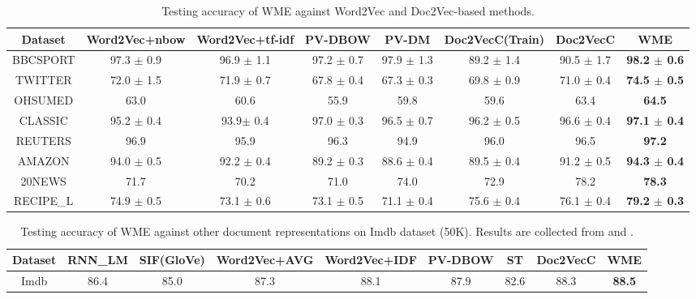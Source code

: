 \documentclass[11pt,a4paper]{article}
\newcommand{\1}{\boldsymbol{1}}
\begin{document}
\begin{table}[h]
\centering
\scriptsize
\caption{Testing accuracy of WME against Word2Vec and Doc2Vec-based methods.}
\label{App:tb:comp_word2vec}
\newcommand{\Bd}[1]{\textbf{#1}}
\begin{center}
    \begin{tabular}{ c c c c c c c c}
    \hline
    Dataset & Word2Vec+nbow & Word2Vec+tf-idf & PV-DBOW & PV-DM & Doc2VecC(Train) & Doc2VecC & WME \\ \hline 
    BBCSPORT  & 97.3 $\pm$ 0.9 & 96.9 $\pm$ 1.1 & 97.2 $\pm$ 0.7 & 97.9 $\pm$ 1.3 & 89.2 $\pm$ 1.4 & 90.5 $\pm$ 1.7 & \Bd{98.2 $\pm$ 0.6} \\ %
    TWITTER  & 72.0 $\pm$ 1.5 & 71.9 $\pm$ 0.7 & 67.8 $\pm$ 0.4 & 67.3 $\pm$ 0.3 & 69.8 $\pm$ 0.9 & 71.0 $\pm$ 0.4 & \Bd{74.5 $\pm$ 0.5} \\ %
    OHSUMED & 63.0 & 60.6 & 55.9 & 59.8 & 59.6 & 63.4 & \Bd{64.5} \\ %
    CLASSIC & 95.2 $\pm$ 0.4 & 93.9$\pm$ 0.4 & 97.0 $\pm$ 0.3 & 96.5 $\pm$ 0.7 & 96.2 $\pm$ 0.5 & 96.6 $\pm$ 0.4  & \Bd{97.1 $\pm$ 0.4} \\ %
    REUTERS & 96.9 & 95.9 & 96.3 & 94.9 & 96.0 & 96.5 & \Bd{97.2} \\ %
    AMAZON & 94.0 $\pm$ 0.5 & 92.2 $\pm$ 0.4 & 89.2 $\pm$ 0.3 & 88.6 $\pm$ 0.4 & 89.5 $\pm$ 0.4 & 91.2 $\pm$ 0.5 & \Bd{94.3 $\pm$ 0.4} \\ %
    20NEWS & 71.7  & 70.2  & 71.0 & 74.0 & 72.9 & 78.2 & \Bd{78.3} \\ %
    RECIPE\_L  & 74.9 $\pm$ 0.5 & 73.1 $\pm$ 0.6 & 73.1 $\pm$ 0.5 & 71.1 $\pm$ 0.4 & 75.6 $\pm$ 0.4  & 76.1 $\pm$ 0.4  & \Bd{79.2 $\pm$ 0.3} \\ \hline
    \end{tabular}
\end{center}
\end{table}

\begin{table}[h]
\centering
\scriptsize
\caption{Testing accuracy of WME against other document representations on Imdb dataset (50K). Results are collected from \cite{Chen2017efficient} and \cite{arora2017simple}.}
\vspace{-0mm}
\label{tb:comp_imdb}
\newcommand{\Bd}[1]{\textbf{#1}}
\begin{center}
    \begin{tabular}{ c c c c c c c c c}
    \hline
    Dataset & RNN\_LM & SIF(GloVe) & Word2Vec+AVG & Word2Vec+IDF & PV-DBOW & ST & Doc2VecC & WME \\ \hline 
    Imdb & 86.4 & 85.0 & 87.3 & 88.1 & 87.9 & 82.6 & 88.3 & \Bd{88.5} \\ \hline
    \end{tabular}
\end{center}
\vspace{0mm}
\end{table}
\end{document}
